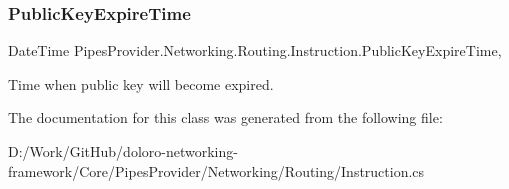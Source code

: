 \subsubsection{\texorpdfstring{Public\+Key\+Expire\+Time}{PublicKeyExpireTime}}
{\footnotesize\ttfamily Date\+Time Pipes\+Provider.\+Networking.\+Routing.\+Instruction.\+Public\+Key\+Expire\+Time\hspace{0.3cm}{\ttfamily [get]}, {}}



Time when public key will become expired. 



The documentation for this class was generated from the following file\+:\begin{DoxyCompactItemize}
\item 
D\+:/\+Work/\+Git\+Hub/doloro-\/networking-\/framework/\+Core/\+Pipes\+Provider/\+Networking/\+Routing/Instruction.\+cs\end{DoxyCompactItemize}
